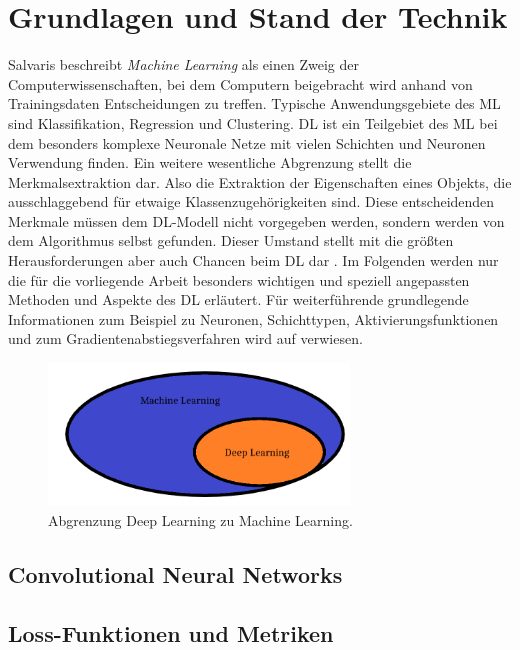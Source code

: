 \section{Grundlagen und Stand der Technik}

Salvaris beschreibt \textit{Machine Learning} als einen Zweig der Computerwissenschaften, bei dem Computern beigebracht wird anhand von Trainingsdaten Entscheidungen zu treffen. Typische Anwendungsgebiete des ML sind Klassifikation, Regression und Clustering. DL ist ein Teilgebiet des ML bei dem besonders komplexe Neuronale Netze mit vielen Schichten und Neuronen Verwendung finden. Ein weitere wesentliche Abgrenzung stellt die Merkmalsextraktion dar. Also die Extraktion der Eigenschaften eines Objekts, die ausschlaggebend für etwaige Klassenzugehörigkeiten sind. Diese entscheidenden Merkmale müssen dem DL-Modell nicht vorgegeben werden, sondern werden von dem Algorithmus selbst gefunden. Dieser Umstand stellt mit die größten Herausforderungen aber auch Chancen beim DL dar \cite[S.32-47]{dlazure2019}.  Im Folgenden werden nur die für die vorliegende Arbeit besonders wichtigen und speziell angepassten Methoden und Aspekte des DL erläutert. Für weiterführende grundlegende Informationen zum Beispiel zu Neuronen, Schichttypen, Aktivierungsfunktionen und zum Gradientenabstiegsverfahren wird auf \cite{dlbook2018} verwiesen.
\begin{figure}[h]\label{dlmlunterschied}
  \centering
  \includegraphics[width=8cm]{mldlunterschied.png}
  \caption{Abgrenzung Deep Learning zu Machine Learning.}
\end{figure}

\subsection{Convolutional Neural Networks}

\subsection{Loss-Funktionen und Metriken}